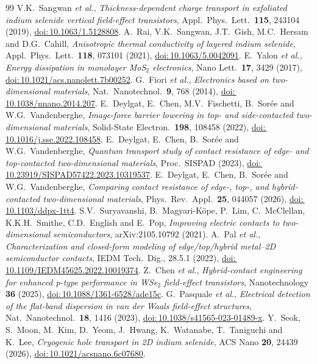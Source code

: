 \documentclass[11pt]{article}
\providecommand{\doi}[1]{\href{https://doi.org/#1}{doi:\,#1}}
\begin{document}
\begin{thebibliography}{99}
 V.K.~Sangwan \textit{et al.}, \textit{Thickness-dependent charge transport in exfoliated indium selenide vertical field-effect transistors}, Appl.\ Phys.\ Lett.\ \textbf{115}, 243104 (2019), \doi{10.1063/1.5128808}.
 A.~Rai, V.K.~Sangwan, J.T.~Gish, M.C.~Hersam and D.G.~Cahill, \textit{Anisotropic thermal conductivity of layered indium selenide}, Appl.\ Phys.\ Lett.\ \textbf{118}, 073101 (2021), \doi{10.1063/5.0042091}.
 E.~Yalon \textit{et al.}, \textit{Energy dissipation in monolayer MoS$_2$ electronics}, Nano Lett.\ \textbf{17}, 3429 (2017), \doi{10.1021/acs.nanolett.7b00252}.
 G.~Fiori \textit{et al.}, \textit{Electronics based on two-dimensional materials}, Nat.\ Nanotechnol.\ \textbf{9}, 768 (2014), \doi{10.1038/nnano.2014.207}.
 E.~Deylgat, E.~Chen, M.V.~Fischetti, B.~Sor\'ee and W.G.~Vandenberghe, \textit{Image-force barrier lowering in top- and side-contacted two-dimensional materials}, Solid-State Electron.\ \textbf{198}, 108458 (2022), \doi{10.1016/j.sse.2022.108458}.
 E.~Deylgat, E.~Chen, B.~Sor\'ee and W.G.~Vandenberghe, \textit{Quantum transport study of contact resistance of edge- and top-contacted two-dimensional materials}, Proc.\ SISPAD (2023), \doi{10.23919/SISPAD57422.2023.10319537}.
 E.~Deylgat, E.~Chen, B.~Sor\'ee and W.G.~Vandenberghe, \textit{Comparing contact resistance of edge-, top-, and hybrid-contacted two-dimensional materials}, Phys.\ Rev.\ Appl.\ \textbf{25}, 044057 (2026), \doi{10.1103/ddpx-1tt4}.
 S.V.~Suryavanshi, B.~Magyari-K\"ope, P.~Lim, C.~McClellan, K.K.H.~Smithe, C.D.~English and E.~Pop, \textit{Improving electric contacts to two-dimensional semiconductors}, arXiv:2105.10792 (2021).
 A.~Pal \textit{et al.}, \textit{Characterization and closed-form modeling of edge/top/hybrid metal--2D semiconductor contacts}, IEDM Tech.\ Dig., 28.5.1 (2022), \doi{10.1109/IEDM45625.2022.10019374}.
 Z.~Chen \textit{et al.}, \textit{Hybrid-contact engineering for enhanced p-type performance in WSe$_2$ field-effect transistors}, Nanotechnology \textbf{36} (2025), \doi{10.1088/1361-6528/ade15c}.
 G.~Pasquale \textit{et al.}, \textit{Electrical detection of the flat-band dispersion in van der Waals field-effect structures}, Nat.\ Nanotechnol.\ \textbf{18}, 1416 (2023), \doi{10.1038/s41565-023-01489-x}.
 Y.~Seok, S.~Moon, M.~Kim, D.~Yeom, J.~Hwang, K.~Watanabe, T.~Taniguchi and K.~Lee, \textit{Cryogenic hole transport in 2D indium selenide}, ACS Nano \textbf{20}, 24439 (2026), \doi{10.1021/acsnano.6c07680}.

\end{thebibliography}
\end{document}

